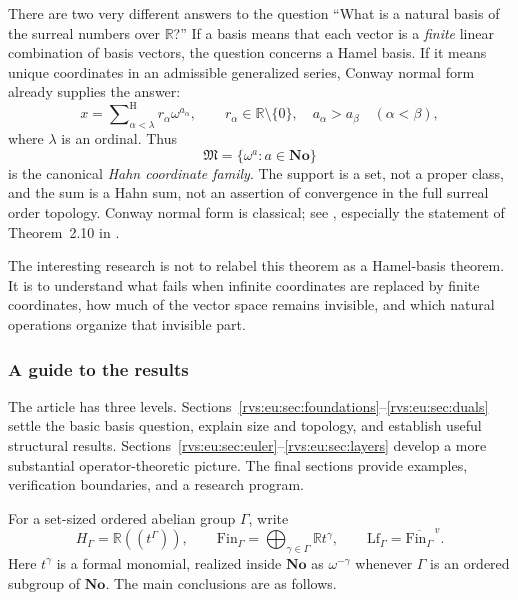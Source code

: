 \documentclass[11pt,letterpaper]{article}
\numberwithin{equation}{section}
\theoremstyle{definition}
\theoremstyle{remark}
\newcommand{\No}{\mathbf{No}}
\newcommand{\R}{\mathbb{R}}
\newcommand{\M}{\mathfrak{M}}
\newcommand{\hSum}{\mathop{\sum}\nolimits^{\mathrm H}}
\newcommand{\FinS}[1]{\mathrm{Fin}_{#1}}%
\newcommand{\LfS}[1]{\mathrm{Lf}_{#1}}%
\begin{document}
There are two very different answers to the question ``What is a natural basis of the surreal numbers over $\R$?'' If a basis means that each vector is a \emph{finite} linear combination of basis vectors, the question concerns a Hamel basis. If it means unique coordinates in an admissible generalized series, Conway normal form already supplies the answer:
\begin{equation}\label{rvs:eu:eq:normalintro}
 x=\hSum_{\alpha<\lambda}r_\alpha\omega^{a_\alpha},
 \qquad r_\alpha\in\R\setminus\{0\},\quad
 a_\alpha>a_\beta\quad(\alpha<\beta),
\end{equation}
where $\lambda$ is an ordinal. Thus
\[
 \M=\{\omega^a:a\in\No\}
\]
is the canonical \emph{Hahn coordinate family}. The support is a set, not a proper class, and the sum is a Hahn sum, not an assertion of convergence in the full surreal order topology. Conway normal form is classical; see \cite{Conway,Gonshor,MantovaMatusinski}, especially the statement of Theorem~2.10 in \cite{MantovaMatusinski}.

The interesting research is not to relabel this theorem as a Hamel-basis theorem. It is to understand what fails when infinite coordinates are replaced by finite coordinates, how much of the vector space remains invisible, and which natural operations organize that invisible part.
\subsubsection{A guide to the results}
The article has three levels. Sections~\ref{rvs:eu:sec:foundations}--\ref{rvs:eu:sec:duals} settle the basic basis question, explain size and topology, and establish useful structural results. Sections~\ref{rvs:eu:sec:euler}--\ref{rvs:eu:sec:layers} develop a more substantial operator-theoretic picture. The final sections provide examples, verification boundaries, and a research program.

For a set-sized ordered abelian group $\Gamma$, write
\[
 H_\Gamma=\R((t^\Gamma)),\qquad
 \FinS{\Gamma}=\bigoplus_{\gamma\in\Gamma}\R t^\gamma,
 \qquad \LfS{\Gamma}=\overline{\FinS{\Gamma}}^{\,v}.
\]
Here $t^\gamma$ is a formal monomial, realized inside $\No$ as $\omega^{-\gamma}$ whenever $\Gamma$ is an ordered subgroup of $\No$. The main conclusions are as follows.
\end{document}
